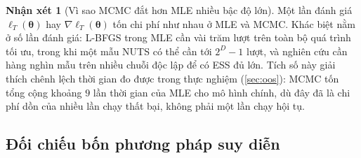 \documentclass[12pt,a4paper]{article}
\numberwithin{equation}{section}
\theoremstyle{definition}
\newtheorem{remark}{Nhận xét}[section]
\newcommand{\Param}{\symbf{\theta}}
\begin{document}
	\begin{remark}[Vì sao MCMC đắt hơn MLE nhiều bậc độ lớn]\label{rem:mcmc-cost}
		Một lần đánh giá $\ell_T(\Param)$ hay $\nabla\ell_T(\Param)$ tốn chi phí như nhau ở MLE
		và MCMC. Khác biệt nằm ở số lần đánh giá: L-BFGS trong MLE cần vài trăm lượt trên toàn bộ
		quá trình tối ưu, trong khi một mẫu NUTS có thể cần tới $2^{D}-1$ lượt, và nghiên cứu cần
		hàng nghìn mẫu trên nhiều chuỗi độc lập để có ESS đủ lớn. Tích số này giải thích chênh
		lệch thời gian đo được trong thực nghiệm (\cref{sec:oos}): MCMC tốn tổng cộng khoảng $9$
		lần thời gian của MLE cho mô hình chính, dù đây đã là chi phí dồn của nhiều lần chạy thất
		bại, không phải một lần chạy hội tụ.
	\end{remark}

	\subsection{Đối chiếu bốn phương pháp suy diễn}\label{subsec:comparison}
\end{document}
